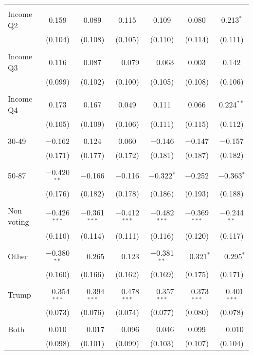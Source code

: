 \begin{tabular}{@{\extracolsep{5pt}}lcccccc}
  & & & & & & \\ 
 Income Q2 & 0.159 & 0.089 & 0.115 & 0.109 & 0.080 & 0.213$^{*}$ \\ 
  & (0.104) & (0.108) & (0.105) & (0.110) & (0.114) & (0.111) \\ 
  & & & & & & \\ 
 Income Q3 & 0.116 & 0.087 & $-$0.079 & $-$0.063 & 0.003 & 0.142 \\ 
  & (0.099) & (0.102) & (0.100) & (0.105) & (0.108) & (0.106) \\ 
  & & & & & & \\ 
 Income Q4 & 0.173 & 0.167 & 0.049 & 0.111 & 0.066 & 0.224$^{**}$ \\ 
  & (0.105) & (0.109) & (0.106) & (0.111) & (0.115) & (0.112) \\ 
  & & & & & & \\ 
 30-49 & $-$0.162 & 0.124 & 0.060 & $-$0.146 & $-$0.147 & $-$0.157 \\ 
  & (0.171) & (0.177) & (0.172) & (0.181) & (0.187) & (0.182) \\ 
  & & & & & & \\ 
 50-87 & $-$0.420$^{**}$ & $-$0.166 & $-$0.116 & $-$0.322$^{*}$ & $-$0.252 & $-$0.363$^{*}$ \\ 
  & (0.176) & (0.182) & (0.178) & (0.186) & (0.193) & (0.188) \\ 
  & & & & & & \\ 
 Non voting & $-$0.426$^{***}$ & $-$0.361$^{***}$ & $-$0.412$^{***}$ & $-$0.482$^{***}$ & $-$0.369$^{***}$ & $-$0.244$^{**}$ \\ 
  & (0.110) & (0.114) & (0.111) & (0.116) & (0.120) & (0.117) \\ 
  & & & & & & \\ 
 Other & $-$0.380$^{**}$ & $-$0.265 & $-$0.123 & $-$0.381$^{**}$ & $-$0.321$^{*}$ & $-$0.295$^{*}$ \\ 
  & (0.160) & (0.166) & (0.162) & (0.169) & (0.175) & (0.171) \\ 
  & & & & & & \\ 
 Trump & $-$0.354$^{***}$ & $-$0.394$^{***}$ & $-$0.478$^{***}$ & $-$0.357$^{***}$ & $-$0.373$^{***}$ & $-$0.401$^{***}$ \\ 
  & (0.073) & (0.076) & (0.074) & (0.077) & (0.080) & (0.078) \\ 
  & & & & & & \\ 
 Both & 0.010 & $-$0.017 & $-$0.096 & $-$0.046 & 0.099 & $-$0.010 \\ 
  & (0.098) & (0.101) & (0.099) & (0.103) & (0.107) & (0.104) \\ 

\end{tabular}
